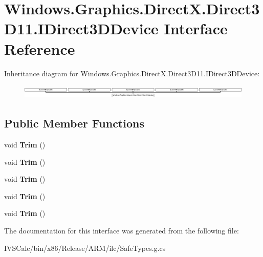 \hypertarget{interface_windows_1_1_graphics_1_1_direct_x_1_1_direct3_d11_1_1_i_direct3_d_device}{}\section{Windows.\+Graphics.\+Direct\+X.\+Direct3\+D11.\+I\+Direct3\+D\+Device Interface Reference}
\label{interface_windows_1_1_graphics_1_1_direct_x_1_1_direct3_d11_1_1_i_direct3_d_device}
Inheritance diagram for Windows.\+Graphics.\+Direct\+X.\+Direct3\+D11.\+I\+Direct3\+D\+Device\+:\begin{figure}[H]
\begin{center}
\leavevmode
\includegraphics[height=0.664688cm]{interface_windows_1_1_graphics_1_1_direct_x_1_1_direct3_d11_1_1_i_direct3_d_device}
\end{center}
\end{figure}
\subsection*{Public Member Functions}
\begin{DoxyCompactItemize}
\item 
\mbox{\label{interface_windows_1_1_graphics_1_1_direct_x_1_1_direct3_d11_1_1_i_direct3_d_device_a083848337662e559dd2d28ccbb8a1371}} 
void {\bfseries Trim} ()
\item 
\mbox{\label{interface_windows_1_1_graphics_1_1_direct_x_1_1_direct3_d11_1_1_i_direct3_d_device_a083848337662e559dd2d28ccbb8a1371}} 
void {\bfseries Trim} ()
\item 
\mbox{\label{interface_windows_1_1_graphics_1_1_direct_x_1_1_direct3_d11_1_1_i_direct3_d_device_a083848337662e559dd2d28ccbb8a1371}} 
void {\bfseries Trim} ()
\item 
\mbox{\label{interface_windows_1_1_graphics_1_1_direct_x_1_1_direct3_d11_1_1_i_direct3_d_device_a083848337662e559dd2d28ccbb8a1371}} 
void {\bfseries Trim} ()
\item 
\mbox{\label{interface_windows_1_1_graphics_1_1_direct_x_1_1_direct3_d11_1_1_i_direct3_d_device_a083848337662e559dd2d28ccbb8a1371}} 
void {\bfseries Trim} ()
\end{DoxyCompactItemize}


The documentation for this interface was generated from the following file\+:\begin{DoxyCompactItemize}
\item 
I\+V\+S\+Calc/bin/x86/\+Release/\+A\+R\+M/ilc/Safe\+Types.\+g.\+cs\end{DoxyCompactItemize}
